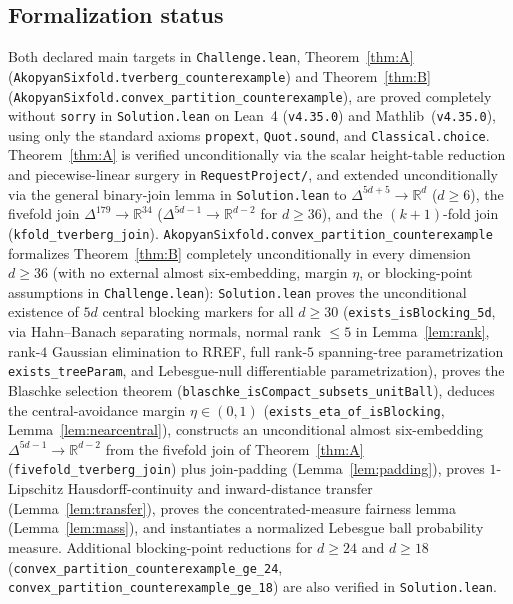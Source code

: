 \documentclass[a4paper,11pt,reqno]{amsart}
\newcommand{\R}{\mathbb R}
\theoremstyle{definition}
\theoremstyle{remark}
\numberwithin{equation}{section}
\begin{document}
\subsection*{Formalization status}
\begin{sloppypar}
Both declared main targets in \texttt{Challenge.lean}, Theorem~\ref{thm:A}
(\texttt{AkopyanSixfold.\allowbreak tverberg\_\allowbreak counterexample}) and
Theorem~\ref{thm:B}
(\texttt{AkopyanSixfold.\allowbreak convex\_\allowbreak partition\_\allowbreak counterexample}),
are proved completely without \texttt{sorry} in \texttt{Solution.lean} on Lean~4
(\texttt{v4.35.0}) and Mathlib~(\texttt{v4.35.0}), using only the standard
axioms \texttt{propext}, \texttt{Quot.sound}, and \texttt{Classical.choice}.
Theorem~\ref{thm:A} is verified unconditionally via the scalar height-table
reduction and piecewise-linear surgery in \texttt{RequestProject/}, and
extended unconditionally via the general binary-join lemma in
\texttt{Solution.lean} to $\Delta^{5d+5}\to\R^d$ ($d\ge6$), the fivefold join
$\Delta^{179}\to\R^{34}$ ($\Delta^{5d-1}\to\R^{d-2}$ for $d\ge36$), and the
$(k+1)$-fold join (\texttt{kfold\_tverberg\_join}).
\texttt{AkopyanSixfold.\allowbreak convex\_\allowbreak partition\_\allowbreak counterexample}
formalizes Theorem~\ref{thm:B} completely unconditionally in every dimension
$d\ge36$ (with no external almost six-embedding, margin $\eta$, or
blocking-point assumptions in \texttt{Challenge.lean}): \texttt{Solution.lean}
proves the unconditional existence of $5d$ central blocking markers for all
$d\ge30$ (\texttt{exists\_\allowbreak isBlocking\_\allowbreak 5d}, via
Hahn--Banach separating normals, normal rank $\le 5$ in Lemma~\ref{lem:rank},
rank-$4$ Gaussian elimination to RREF, full rank-$5$ spanning-tree
parametrization \texttt{exists\_\allowbreak treeParam}, and Lebesgue-null
differentiable parametrization), proves the Blaschke selection theorem
(\texttt{blaschke\_\allowbreak isCompact\_\allowbreak subsets\_\allowbreak unitBall}),
deduces the central-avoidance margin $\eta\in(0,1)$
(\texttt{exists\_\allowbreak eta\_\allowbreak of\_\allowbreak isBlocking}, Lemma~\ref{lem:nearcentral}),
constructs an unconditional almost six-embedding $\Delta^{5d-1}\to\R^{d-2}$
from the fivefold join of Theorem~\ref{thm:A} (\texttt{fivefold\_\allowbreak tverberg\_\allowbreak join})
plus join-padding (Lemma~\ref{lem:padding}), proves $1$-Lipschitz Hausdorff-continuity and
inward-distance transfer (Lemma~\ref{lem:transfer}), proves the
concentrated-measure fairness lemma (Lemma~\ref{lem:mass}), and instantiates
a normalized Lebesgue ball probability measure. Additional blocking-point
reductions for $d\ge24$ and $d\ge18$
(\texttt{convex\_\allowbreak partition\_\allowbreak counterexample\_\allowbreak ge\_24},
\texttt{convex\_\allowbreak partition\_\allowbreak counterexample\_\allowbreak ge\_18}) are also
verified in \texttt{Solution.lean}.
\end{sloppypar}
\end{document}
